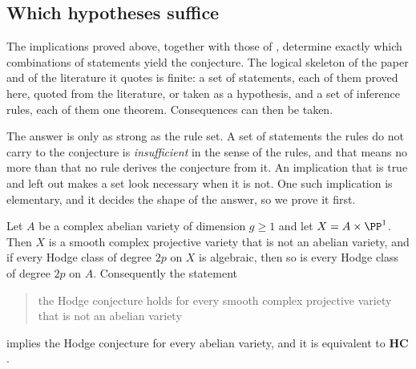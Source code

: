 \subsection{Which hypotheses suffice}
\label{ssec:closure}

The implications proved above, together with those of ,
determine exactly which combinations of statements yield the conjecture. The
logical skeleton of the paper and of the literature it quotes is finite: a
set of statements, each of them proved here, quoted from the literature, or
taken as a hypothesis, and a set of inference rules, each of them one
theorem. Consequences can then be taken.

The answer is only as strong as the rule set. A set of statements the rules
do not carry to the conjecture is \emph{insufficient} in the sense of the
rules, and that means no more than that no rule derives the conjecture from
it. An implication that is true and left out makes a set look necessary when
it is not. One such implication
is elementary, and it decides the shape of the answer, so we prove it first.

\begin{proposition}\label{prop:f3ishc}
Let $A$ be a complex abelian variety of dimension $g\ge1$ and let
$X=A\times\PP^{1}$. Then $X$ is a smooth complex projective variety that is
not an abelian variety, and if every Hodge class of degree $2p$ on $X$ is
algebraic, then so is every Hodge class of degree $2p$ on $A$. Consequently
the statement
\begin{quote}
the Hodge conjecture holds for every smooth complex projective variety that
is not an abelian variety
\end{quote}
implies the Hodge conjecture for every abelian variety, and it is equivalent
to $\mathbf{HC}$.
\end{proposition}

